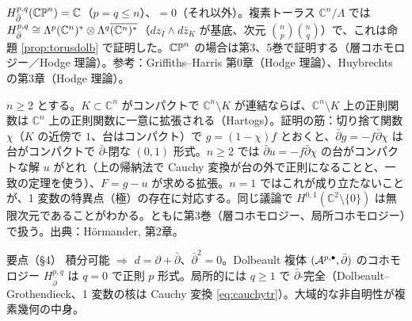 \begin{ex}\label{ex:hpq}\tC
$H^{p,q}_{\bar\partial}(\mathbb{CP}^n)=\mathbb C$（$p=q\le n$）、$=0$（それ以外）。複素トーラス $\mathbb C^n/\Lambda$ では $H^{p,q}_{\bar\partial}\cong\Lambda^p(\mathbb C^n)^*\otimes\Lambda^q\overline{(\mathbb C^n)^*}$（$dz_I\wedge d\bar z_K$ が基底、次元 $\binom np\binom nq$）で、これは命題 \ref{prop:torusdolb} で証明した。$\mathbb{CP}^n$ の場合は第3、5巻で証明する（層コホモロジー／Hodge 理論）。参考：Griffiths--Harris 第0章（Hodge 理論）、Huybrechts の第3章（Hodge 理論）。
\end{ex}


\begin{rem}\label{rem:hartogs}\tC
$n\ge2$ とする。$K\subset\mathbb C^n$ がコンパクトで $\mathbb C^n\setminus K$ が連結ならば、$\mathbb C^n\setminus K$ 上の正則関数は $\mathbb C^n$ 上の正則関数に一意に拡張される（Hartogs）。証明の筋：切り捨て関数 $\chi$（$K$ の近傍で $1$、台はコンパクト）で $g=(1-\chi)f$ とおくと、$\bar\partial g=-f\bar\partial\chi$ は台がコンパクトで $\bar\partial$-閉な $(0,1)$ 形式。$n\ge2$ では $\bar\partial u=-f\bar\partial\chi$ の台がコンパクトな解 $u$ がとれ（上の帰納法で Cauchy 変換が台の外で正則になることと、一致の定理を使う）、$F=g-u$ が求める拡張。$n=1$ ではこれが成り立たないことが、1 変数の特異点（極）の存在に対応する。同じ議論で $H^{0,1}(\mathbb C^2\setminus\{0\})$ は無限次元であることがわかる。ともに第3巻（層コホモロジー、局所コホモロジー）で扱う。出典：Hörmander, 第2章。
\end{rem}

\begin{keybox}{要点（§4）}
積分可能 $\Rightarrow$ $d=\partial+\bar\partial$、$\bar\partial^2=0$。Dolbeault 複体 $(\mathcal A^{p,\bullet},\bar\partial)$ のコホモロジー $H^{p,q}_{\bar\partial}$ は $q=0$ で正則 $p$ 形式。局所的には $q\ge1$ で $\bar\partial$-完全（Dolbeault--Grothendieck、1 変数の核は Cauchy 変換 \eqref{eq:cauchytr}）。大域的な非自明性が複素幾何の中身。
\end{keybox}

